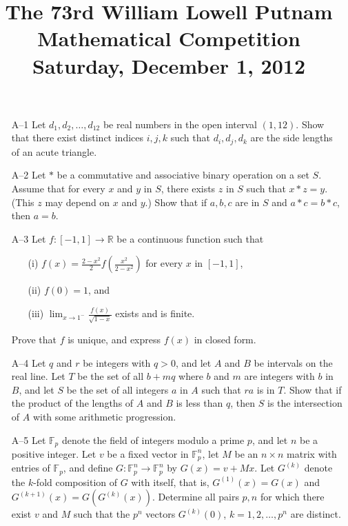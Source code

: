 \documentclass[amssymb,twocolumn,pra,10pt,aps]{revtex4-1}
\begin{document}
\title{The 73rd William Lowell Putnam Mathematical Competition \\
    Saturday, December 1, 2012}
\maketitle

\newcommand{\FF}{\mathbb{F}}
\newcommand{\RR}{\mathbb{R}}

\begin{itemize}

\item[A--1] Let $d_1, d_2, \dots, d_{12}$ be real numbers in the open
interval $(1, 12)$. Show that there exist distinct indices $i, j, k$
such that $d_i, d_j, d_k$ are the side lengths of an acute triangle.

\item[A--2]
Let $*$ be a commutative and associative binary operation on a set $S$. Assume that for every $x$
and $y$ in $S$, there exists $z$ in $S$ such that $x * z = y$. (This $z$ may depend on $x$ and $y$.)
Show that if $a,b,c$ are in $S$ and $a*c = b*c$, then $a=b$.

\item[A--3]
Let $f: [-1, 1] \to \RR$ be a continuous function such that
\begin{itemize}
\item[(i)]
$f(x) = \frac{2-x^2}{2} f \left( \frac{x^2}{2-x^2} \right)$ for every $x$ in $[-1, 1]$,
\item[(ii)]
$f(0) = 1$, and
\item[(iii)]
$\lim_{x \to 1^-} \frac{f(x)}{\sqrt{1-x}}$ exists and is finite.
\end{itemize}
Prove that $f$ is unique, and express $f(x)$ in closed form.

\item[A--4]
Let $q$ and $r$ be integers with $q > 0$, and let $A$ and $B$ be intervals on the real line.
Let $T$ be the set of all $b+mq$ where $b$ and $m$ are integers with $b$ in $B$,
and let $S$ be the set of all integers $a$ in $A$ such that $ra$ is in $T$. Show that if the
product of the lengths of $A$ and $B$ is less than $q$, then $S$ is the intersection of $A$
with some arithmetic progression.

\item[A--5]
Let $\FF_p$ denote the field of integers modulo a prime $p$, and let $n$ be a positive integer.
Let $v$ be a fixed vector in $\FF_p^n$, let $M$ be an $n \times n$ matrix with entries of $\FF_p$,
and define $G: \FF_p^n \to \FF_p^n$ by $G(x) = v + Mx$. Let $G^{(k)}$ denote the $k$-fold
composition of $G$ with itself, that is, $G^{(1)}(x) = G(x)$ and $G^{(k+1)}(x) = G(G^{(k)}(x))$.
Determine all pairs $p, n$ for which there exist $v$ and $M$ such that the $p^n$ vectors
$G^{(k)}(0)$, $k=1,2,\dots,p^n$ are distinct.


\end{itemize}
\end{document}
